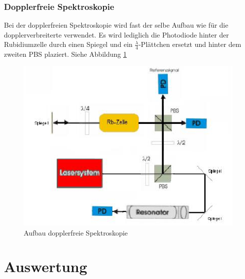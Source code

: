 \documentclass[12pt]{article}
\begin{document}
\subsubsection{Dopplerfreie Spektroskopie}
Bei der dopplerfreien Spektroskopie wird fast der selbe Aufbau wie für die dopplerverbreiterte verwendet. Es wird lediglich die Photodiode hinter der Rubidiumzelle durch einen Spiegel und ein $\frac{\lambda}{4}$-Plättchen ersetzt und hinter dem zweiten PBS plaziert. Siehe Abbildung \ref{skizze-dopplerfrei}
\begin{figure}[H]
 \includegraphics[width=0.9\linewidth]{pictures/aufbau_dopplerfrei.eps}
 \caption{Aufbau dopplerfreie Spektroskopie}
 \label{skizze-dopplerfrei}
\end{figure}
\newpage

\section{Auswertung}
\end{document}
